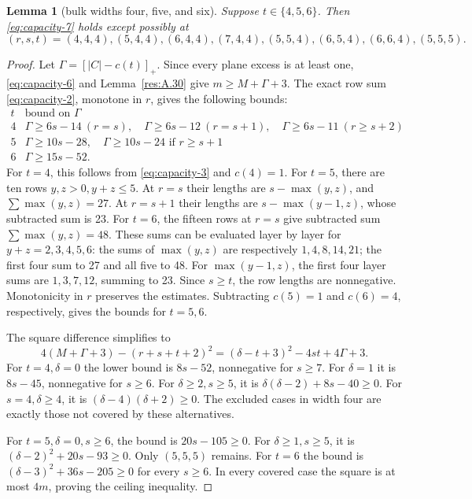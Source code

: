 \documentclass[11pt]{article}
\newtheorem{lemma}[theorem]{Lemma}
\theoremstyle{definition}
\theoremstyle{remark}
\theoremstyle{plain}
\begin{document}
\begin{lemma}[bulk widths four, five, and six]\label{res:A.32} Suppose \(t\in\{4,5,6\}\). Then \eqref{eq:capacity-7} holds except possibly at
\[
(r,s,t)=(4,4,4),(5,4,4),(6,4,4),(7,4,4),
(5,5,4),(6,5,4),(6,6,4),(5,5,5).
\]
\end{lemma}
\begin{proof} Let \(\Gamma=[|C|-c(t)]_+\). Since every plane excess is at least one, \eqref{eq:capacity-6} and Lemma~\ref{res:A.30} give
\(m\ge M+\Gamma+3\).
The exact row sum \eqref{eq:capacity-2}, monotone in \(r\), gives the following bounds:
\[
\begin{array}{c|c}
t&\text{bound on }\Gamma\\\hline
4&\Gamma\ge6s-14\ (r=s),\quad \Gamma\ge6s-12\ (r=s+1),\quad \Gamma\ge6s-11\ (r\ge s+2)\\
5&\Gamma\ge10s-28,\quad \Gamma\ge10s-24\text{ if }r\ge s+1\\
6&\Gamma\ge15s-52.
\end{array}
\]
For \(t=4\), this follows from \eqref{eq:capacity-3} and \(c(4)=1\). For \(t=5\), there are ten rows \(y,z>0,y+z\le5\). At \(r=s\) their lengths are \(s-\max(y,z)\), and \(\sum\max(y,z)=27\). At \(r=s+1\) their lengths are \(s-\max(y-1,z)\), whose subtracted sum is 23. For \(t=6\), the fifteen rows at \(r=s\) give subtracted sum \(\sum\max(y,z)=48\). These sums can be evaluated layer by layer for \(y+z=2,3,4,5,6\): the sums of \(\max(y,z)\) are respectively \(1,4,8,14,21\); the first four sum to 27 and all five to 48. For \(\max(y-1,z)\), the first four layer sums are \(1,3,7,12\), summing to 23. Since \(s\ge t\), the row lengths are nonnegative. Monotonicity in \(r\) preserves the estimates. Subtracting \(c(5)=1\) and \(c(6)=4\), respectively, gives the bounds for \(t=5,6\).

The square difference simplifies to
\[
4(M+\Gamma+3)-(r+s+t+2)^2
=(\delta-t+3)^2-4st+4\Gamma+3.
\]
For \(t=4,\delta=0\) the lower bound is \(8s-52\), nonnegative for \(s\ge7\). For \(\delta=1\) it is \(8s-45\), nonnegative for \(s\ge6\). For \(\delta\ge2,s\ge5\), it is \(\delta(\delta-2)+8s-40\ge0\). For \(s=4,\delta\ge4\), it is \((\delta-4)(\delta+2)\ge0\). The excluded cases in width four are exactly those not covered by these alternatives.

For \(t=5,\delta=0,s\ge6\), the bound is \(20s-105\ge0\). For \(\delta\ge1,s\ge5\), it is \((\delta-2)^2+20s-93\ge0\). Only \((5,5,5)\) remains. For \(t=6\) the bound is \((\delta-3)^2+36s-205\ge0\) for every \(s\ge6\). In every covered case the square is at most \(4m\), proving the ceiling inequality. \end{proof}
\end{document}
